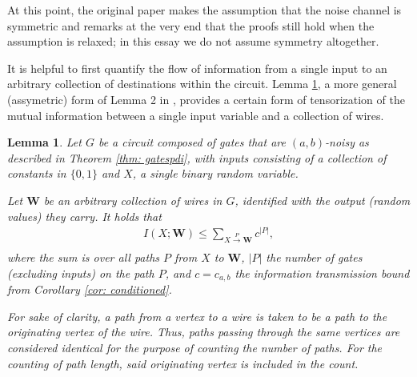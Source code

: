 \documentclass[12pt,reqno]{amsart}
\theoremstyle{plain} %
\newtheorem{lemma}[theorem]{Lemma}
\theoremstyle{remark}
\theoremstyle{definition}
\newcommand{\W}{\mathbf W}
\begin{document}
At this point, the original paper \cite{ES} makes the assumption that the noise channel is symmetric and remarks at the very end that the proofs still hold when the assumption is relaxed; in this essay we do not assume symmetry altogether.

It is helpful to first quantify the flow of information from a single input to an arbitrary collection of destinations within the circuit. Lemma \ref{lem: graphspdi}, a more general (assymetric) form of Lemma 2 in \cite{ES}, provides a certain form of tensorization of the mutual information between a single input variable and a collection of wires.

\begin{lemma}\label{lem: graphspdi}
    Let $G$ be a circuit composed of gates that are $(a,b)$-noisy as described in Theorem \ref{thm: gatespdi}, with inputs consisting of a collection of constants in $\{0,1\}$ and $X$, a single binary random variable.
    
    Let $\mathbf{W}$ be an arbitrary collection of wires in $G$, identified with the output (random values) they carry. It holds that
    \begin{align}
        I(X;\W)\le\sum_{X\xrightarrow[]{P}\W}c^{|P|},
    \end{align}
    where the sum is over all paths $P$ from $X$ to $\W$, $|P|$ the number of gates (excluding inputs) on the path $P$, and $c=c_{a,b}$ the information transmission bound from Corollary \ref{cor: conditioned}.

    For sake of clarity, a path from a vertex to a wire is taken to be a path to the originating vertex of the wire. Thus, paths passing through the same vertices are considered identical for the purpose of counting the number of paths. For the counting of path length, said originating vertex is included in the count.
\end{lemma}
\end{document}
